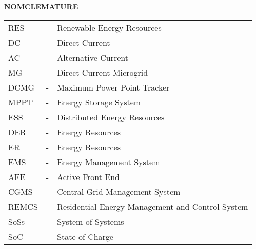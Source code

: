 	\textbf{NOMCLEMATURE}

	\begin{table}[!ht]
		
		\begin{tabular}{ p{2cm} p{1cm} p{6cm} }
		RES		&-&Renewable Energy Resources\\
		DC		&-&Direct Current\\
		AC		&-&Alternative Current\\
		MG		&-&Direct Current Microgrid\\
		DCMG	&-&Maximum Power Point Tracker\\
		MPPT	&-&Energy Storage System\\
		ESS		&-&Distributed Energy Resources\\
		DER		&-&Energy Resources\\
		ER		&-&Energy Resources\\
		EMS		&-&Energy Management System\\
		AFE		&-&Active Front End\\
		CGMS	&-&Central Grid Management System\\
		REMCS	&-&Residential Energy Management and Control System\\
		SoSs	&-&System of Systems\\
		SoC		&-&State of Charge\\		
		\end{tabular}
	\end{table}






